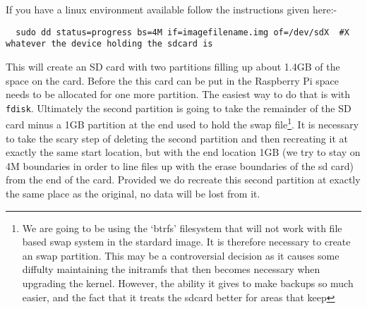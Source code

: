 \documentclass[Draft]{akc}
\begin{document}
If you have a linux environment available follow the instructions given here:- 

\begin{lstlisting}
  sudo dd status=progress bs=4M if=imagefilename.img of=/dev/sdX  #X whatever the device holding the sdcard is
\end{lstlisting}

This will create an SD card with two partitions filling up about 1.4GB of the space on the card.
Before the this card can be put in the Raspberry Pi space needs to be allocated for one more
partition.  The easiest way to do that is with  \texttt{fdisk}.  Ultimately the second partition is
going to take the remainder of the SD card minus a 1GB partition at the end used to hold the swap
file\footnote{We are going to be using the `btrfs' filesystem that will not work with file based swap system in the 
stardard image. It is therefore necessary to create an swap partition. This may be a controversial decision as it causes
some diffulty maintaining the initramfs that then becomes necessary when upgrading the kernel.  However, the ability it gives to
make backups so much easier, and the fact that it treats the sdcard better for areas that keep }.  It is necessary to
take the scary step of deleting the second partition and then recreating it at exactly the same
start location, but with the end location 1GB (we try to stay on 4M boundaries in order to line files up
with the erase boundaries of the sd card) from the end of the card. Provided we do recreate this
second partition at exactly the same place as the original, no data will be lost from it.
\end{document}
